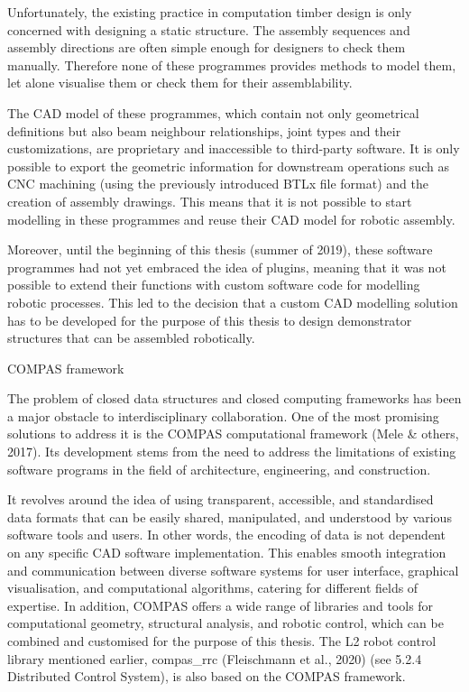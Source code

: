 Unfortunately, the existing practice in computation timber design is only concerned with designing a static structure. The assembly sequences and assembly directions are often simple enough for designers to check them manually. Therefore none of these programmes provides methods to model them, let alone visualise them or check them for their assemblability. 

The CAD model of these programmes, which contain not only geometrical definitions but also beam neighbour relationships, joint types and their customizations, are proprietary and inaccessible to third-party software. It is only possible to export the geometric information for downstream operations such as CNC machining (using the previously introduced BTLx file format) and the creation of assembly drawings. This means that it is not possible to start modelling in these programmes and reuse their CAD model for robotic assembly. 

Moreover, until the beginning of this thesis (summer of 2019), these software programmes had not yet embraced the idea of plugins, meaning that it was not possible to extend their functions with custom software code for modelling robotic processes. This led to the decision that a custom CAD modelling solution has to be developed for the purpose of this thesis to design demonstrator structures that can be assembled robotically.

COMPAS framework

The problem of closed data structures and closed computing frameworks has been a major obstacle to interdisciplinary collaboration. One of the most promising solutions to address it is the COMPAS computational framework (Mele & others, 2017). Its development stems from the need to address the limitations of existing software programs in the field of architecture, engineering, and construction.

It revolves around the idea of using transparent, accessible, and standardised data formats that can be easily shared, manipulated, and understood by various software tools and users. In other words, the encoding of data is not dependent on any specific CAD software implementation. This enables smooth integration and communication between diverse software systems for user interface, graphical visualisation, and computational algorithms, catering for different fields of expertise. In addition, COMPAS offers a wide range of libraries and tools for computational geometry, structural analysis, and robotic control, which can be combined and customised for the purpose of this thesis. The L2 robot control library mentioned earlier, compas_rrc (Fleischmann et al., 2020) (see 5.2.4 Distributed Control System), is also based on the COMPAS framework.

